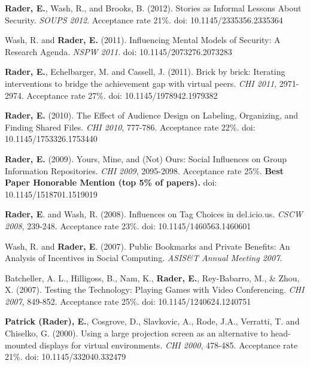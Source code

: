 \documentclass[9pt]{extarticle}
\makeatletter
\renewcommand{\section}{%
  \@startsection{section}{1}{0em}{\baselineskip}{3pt}{\large\bfseries\textsc}}
\makeatother
\begin{document}
\textbf{Rader, E.}, Wash, R., and Brooks, B. (2012). Stories as Informal Lessons About Security. \emph{SOUPS 2012}. Acceptance rate 21\%. doi: 10.1145/2335356.2335364

Wash, R. and \textbf{Rader, E.} (2011). Influencing Mental Models of Security: A Research Agenda. \emph{NSPW 2011}. doi: 10.1145/2073276.2073283

\textbf{Rader, E.}, Echelbarger, M. and Cassell, J. (2011). Brick by brick: Iterating interventions to bridge the achievement gap with virtual peers. \emph{CHI 2011}, 2971-2974. Acceptance rate 27\%. doi: 10.1145/1978942.1979382

\textbf{Rader, E.} (2010). The Effect of Audience Design on Labeling, Organizing, and Finding Shared Files. \emph{CHI 2010}, 777-786. Acceptance rate 22\%. doi: 10.1145/1753326.1753440

\textbf{Rader, E.} (2009). Yours, Mine, and (Not) Ours: Social Influences on Group Information Repositories. \emph{CHI 2009}, 2095-2098. Acceptance rate 25\%. \textbf{Best Paper Honorable Mention (top 5\% of papers).} doi: 10.1145/1518701.1519019

\textbf{Rader, E}. and Wash, R. (2008). Influences on Tag Choices in del.icio.us. \emph{CSCW 2008}, 239-248. Acceptance rate 23\%. doi: 10.1145/1460563.1460601

Wash, R. and \textbf{Rader, E}. (2007). Public Bookmarks and Private Benefits: An Analysis of Incentives in Social Computing. \emph{ASIS\&T Annual Meeting 2007.}

Batcheller, A. L., Hilligoss, B., Nam, K., \textbf{Rader, E.}, Rey-Babarro, M., \& Zhou, X. (2007). Testing the Technology: Playing Games with Video Conferencing. \emph{CHI 2007}, 849-852. Acceptance rate 25\%. doi: 10.1145/1240624.1240751

\textbf{Patrick (Rader), E.}, Cosgrove, D., Slavkovic, A., Rode, J.A., Verratti, T. and Chiselko, G. (2000). Using a large projection screen as an alternative to head-mounted displays for virtual environments. \emph{CHI 2000}, 478-485. Acceptance rate 21\%. doi: 10.1145/332040.332479


\section{Conference and Workshop Papers}
\end{document}

